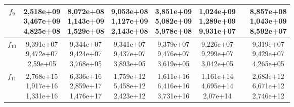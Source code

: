 \begin{table}[t]
\begin{small}
\begin{tabular}{|c|c|c|c|c|c|c|c|}
        $f_9$    & \makecell{2,518e+09 \\ 3,467e+09 \\ 4,825e+08} & \makecell{8,072e+08 \\ 1,143e+09 \\ 1,529e+08} & \makecell{9,053e+08 \\ 1,127e+09 \\ 2,143e+08} & \makecell{3,851e+09 \\ 5,082e+09 \\ 5,978e+08} & \makecell{1,024e+09 \\ 1,289e+09 \\ 9,931e+07} & & \makecell{8,857e+08 \\ 1,043e+09 \\ 8,592e+07} \\\hline
        $f_{10}$ & \makecell{9,391e+07 \\ 9,472e+07 \\ 2,59e+05}  & \makecell{9,344e+07 \\ 9,424e+07 \\ 3,768e+05} & \makecell{9,341e+07 \\ 9,437e+07 \\ 3,893e+05} & \makecell{9,379e+07 \\ 9,476e+07 \\ 3,619e+05} & \makecell{9,226e+07 \\ 9,299e+07 \\ 3,042e+05} & & \makecell{9,319e+07 \\ 9,429e+07 \\ 4,265e+05} \\\hline
        $f_{11}$ & \makecell{2,768e+15 \\ 1,917e+16 \\ 1,331e+16} & \makecell{6,336e+16 \\ 2,859e+17 \\ 1,476e+17} & \makecell{1,759e+12 \\ 5,458e+12 \\ 2,423e+12} & \makecell{1,611e+16 \\ 6,416e+16 \\ 3,731e+16} & \makecell{1,161e+14 \\ 4,695e+14 \\ 2,07e+14}  & & \makecell{2,683e+12 \\ 6,671e+12 \\ 2,746e+12} \\\hline

\end{tabular}
\end{small}
\end{table}
